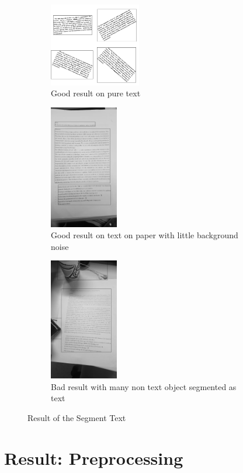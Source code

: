 \documentclass[Report.tex]{subfiles}
\begin{document}
\begin{figure}[ht]
  \centering
  \begin{subfigure}[t]{4cm}
    \includegraphics[width=4cm]{res/segment_text1.png}
    \caption{Good result on pure text}
  \end{subfigure}
  \hspace{7mm}%
  \begin{subfigure}[t]{4cm}
    \includegraphics[width=3cm]{res/segment_text2.png}
    \caption{Good result on text on paper with little background noise}
  \end{subfigure}
  \hspace{5mm}%
  \begin{subfigure}[t]{4cm}
    \includegraphics[width=3cm]{res/segment_text3.png}
    \caption{Bad result with many non text object segmented as text}
  \end{subfigure}
  \caption{Result of the Segment Text}
  \label{fig:Text_seg_result}
\end{figure}

\section{Result: Preprocessing}
\end{document}

